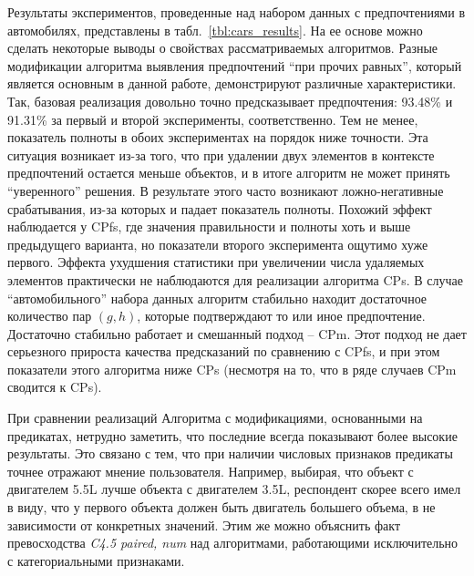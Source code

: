 		Результаты экспериментов, проведенные над набором данных с предпочтениями в автомобилях, представлены в табл.~\ref{tbl:cars_results}. На ее основе можно сделать некоторые выводы о свойствах рассматриваемых алгоритмов. Разные модификации алгоритма выявления предпочтений \enquote{при прочих равных}, который является основным в данной работе, демонстрируют различные характеристики. Так, базовая реализация довольно точно предсказывает предпочтения: 93.48\% и 91.31\% за первый и второй эксперименты, соответственно. Тем не менее, показатель полноты в обоих экспериментах на порядок ниже точности. Эта ситуация возникает из-за того, что при удалении двух элементов в контексте предпочтений остается меньше объектов, и в итоге алгоритм не может принять ``уверенного'' решения. В результате этого часто возникают ложно-негативные срабатывания, из-за которых и падает показатель полноты. Похожий эффект наблюдается у CPfs, где значения правильности и полноты хоть и выше предыдущего варианта, но показатели второго эксперимента ощутимо хуже первого. Эффекта ухудшения статистики при увеличении числа удаляемых элементов практически не наблюдаются для реализации алгоритма CPs. В случае ``автомобильного'' набора данных алгоритм стабильно находит достаточное количество пар $(g,h)$, которые подтверждают то или иное предпочтение. Достаточно стабильно работает и смешанный подход – CPm. Этот подход не дает серьезного прироста качества предсказаний по сравнению с CPfs, и при этом показатели этого алгоритма ниже CPs (несмотря на то, что в ряде случаев CPm сводится к CPs).
		
		При сравнении реализаций Алгоритма с модификациями, основанными на предикатах, нетрудно заметить, что последние всегда показывают более высокие результаты. Это связано с тем, что при наличии числовых признаков предикаты точнее отражают мнение пользователя. Например, выбирая, что объект с двигателем 5.5L лучше объекта с двигателем 3.5L, респондент скорее всего имел в виду, что у первого объекта должен быть двигатель большего объема, в не зависимости от конкретных значений. Этим же можно объяснить факт превосходства \emph{C4.5 paired, num} над алгоритмами, работающими исключительно с категориальными признаками.  
		
